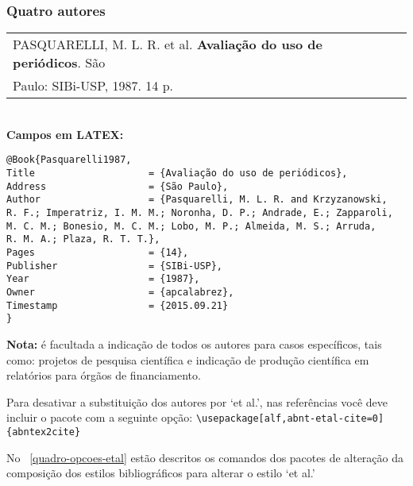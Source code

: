 \subsubsection{Quatro autores}

\begin{tabular}{|l|c|} \hline
PASQUARELLI, M. L. R. et al. \textbf{Avaliação do uso de periódicos}. 
São \\ Paulo: SIBi-USP, 1987. 14 p.\\\hline
\end{tabular}\\

\textbf{Campos em LATEX:}

\begin{verbatim}
@Book{Pasquarelli1987,
Title                    = {Avaliação do uso de periódicos},
Address                  = {São Paulo},
Author                   = {Pasquarelli, M. L. R. and Krzyzanowski,
R. F.; Imperatriz, I. M. M.; Noronha, D. P.; Andrade, E.; Zapparoli,
M. C. M.; Bonesio, M. C. M.; Lobo, M. P.; Almeida, M. S.; Arruda, 
R. M. A.; Plaza, R. T. T.},
Pages                    = {14},
Publisher                = {SIBi-USP},
Year                     = {1987},
Owner                    = {apcalabrez},
Timestamp                = {2015.09.21}
}
\end{verbatim}

\textbf{Nota:} é facultada a indicação de todos os autores para casos específicos, tais como: projetos de pesquisa científica e indicação de
produção científica em relatórios para órgãos de financiamento. 

Para desativar a substituição dos autores por ‘et al.’, nas referências você deve incluir o pacote com a seguinte opção: \verb+\usepackage[alf,abnt-etal-cite=0]{abntex2cite}+

No ~\autoref{quadro-opcoes-etal} estão descritos os comandos dos pacotes de alteração da composição dos estilos bibliográficos para alterar o estilo ‘et al.’

